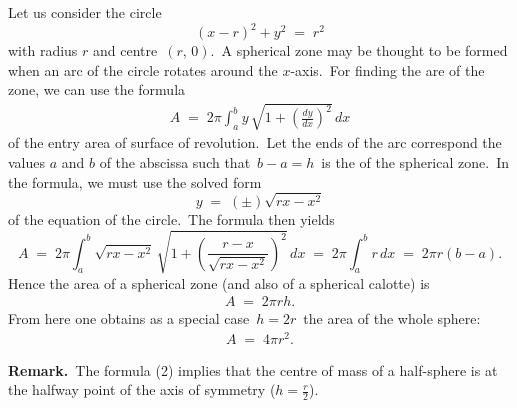 \documentclass[12pt]{article}
\theoremstyle{definition}
\begin{document}
Let us consider the circle 
$$(x\!-\!r)^2\!+\!y^2 \;=\; r^2$$
with radius $r$ and centre \,$(r,\,0)$.\, A spherical zone may be thought to be formed when an arc of the circle rotates around the $x$-axis.\, For finding the are of the zone, we can use the formula
\begin{align}
A \;=\; 2\pi\!\int_{a}^{b}\!y\,\sqrt{1+\left(\frac{dy}{dx}\right)^2}\,dx
\end{align}
of the entry area of surface of revolution.\, Let the ends of the arc correspond the values $a$ and $b$ of the abscissa such that\, $b\!-\!a = h$\, is the  of the spherical zone.\, In the formula, we must use the solved form
$$y \;=\; (\pm)\sqrt{rx\!-\!x^2}$$
of the equation of the circle.\, The formula then yields
$$A \;=\; 2\pi\!\int_a^b\sqrt{rx\!-\!x^2}\,\sqrt{1+\left(\frac{r\!-\!x}{\sqrt{rx\!-\!x^2}}\right)^2}\,dx 
\;=\; 2\pi\!\int_a^br\,dx \;=\; 2\pi r(b\!-\!a).$$
Hence the area of a spherical zone (and also of a spherical calotte) is
\begin{align}
A \;=\; 2\pi rh.
\end{align}
From here one obtains as a special case \,$h = 2r$\, the area of the whole sphere:
\begin{align}
A \;=\; 4\pi r^2.
\end{align}


\textbf{Remark.}\, The formula (2) implies that the centre of mass of a half-sphere is at the halfway point of the axis of symmetry ($h = \frac{r}{2}$).


\end{document}
